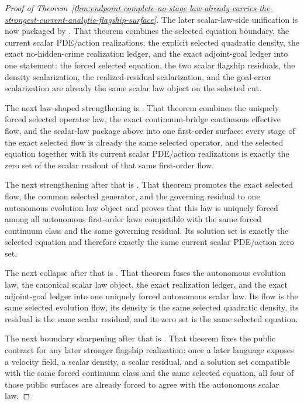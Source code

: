 \begin{proof}[Proof of Theorem~\ref{thm:endpoint-complete-no-stage-law-already-carries-the-strongest-current-analytic-flagship-surface}]
The later scalar-law-side unification is now packaged by
. That
theorem combines the selected equation boundary, the current scalar PDE/action
realizations, the explicit selected quadratic density, the exact no-hidden-crime
realization ledger, and the exact adjoint-goal ledger into one statement: the
forced selected equation, the two scalar flagship residuals, the density
scalarization, the realized-residual scalarization, and the goal-error
scalarization are already the same scalar law object on the selected cut.

The next law-shaped strengthening is
. That
theorem combines the uniquely forced selected operator law, the exact
continuum-bridge
continuous effective flow, and the scalar-law package above into one
first-order surface: every stage of the exact selected flow is already the
same selected operator, and the selected equation together with its current
scalar PDE/action realizations is exactly the zero set of the scalar readout
of that same first-order flow.

The next strengthening after that is
. That
theorem promotes the exact selected flow, the common selected generator, and
the governing residual to one autonomous evolution law object and proves that
this law is uniquely forced among all autonomous first-order laws compatible
with the same forced continuum class and the same governing residual. Its
solution set is exactly the selected equation and therefore exactly the same
current scalar PDE/action zero set.

The next collapse after that is
.
That theorem fuses the autonomous evolution law, the canonical scalar law
object, the exact realization ledger, and the exact adjoint-goal ledger into
one uniquely forced autonomous scalar law. Its flow is the same selected
evolution flow, its density is the same selected quadratic density, its
residual is the same scalar residual, and its zero set is the same selected
equation.

The next boundary sharpening after that is
.
That theorem fixes the public contract for any later stronger flagship
realization: once a later language exposes a velocity field, a scalar density,
a scalar residual, and a solution set compatible with the same forced
continuum class and the same selected equation, all four of those public
surfaces are already forced to agree with the autonomous scalar law.


\end{proof}
